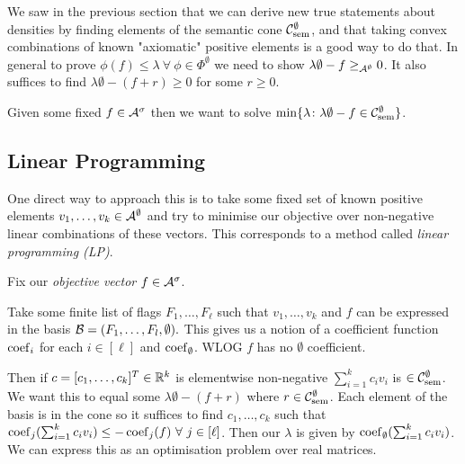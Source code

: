We saw in the previous section that we can derive new true statements about densities
by finding elements of the semantic cone
$\mathcal{C}_\mathrm{sem}^\emptyset$, and that taking convex combinations of known
"axiomatic" positive elements is a good way to do that. In general to prove
$\phi(f) \leq \lambda\ \forall\ \phi\in\Phi^\emptyset$
we need to show $\lambda\emptyset - f \geq_{\mathcal{A}^\emptyset} 0$. It also
suffices to find $\lambda\emptyset - (f + r) \geq 0$ for some $r \geq 0$.

Given some fixed $f\in\mathcal{A}^\sigma$ then we want to solve
$\min\{\lambda\colon \lambda\emptyset - f \in \mathcal{C}_\mathrm{sem}^\emptyset\}$.

\subsection{Linear Programming}

One direct way to approach this is to take some fixed set of known positive elements
$v_1, \dots, v_k\in\mathcal{A}^\emptyset$ and try to minimise our objective over non-negative linear
combinations of these vectors. This corresponds to a method called \textit{linear programming (LP)}.

Fix our \textit{objective vector} $f\in\mathcal{A}^\sigma$.

Take some finite list of flags $F_1, \dots, F_\ell$ such that $v_1, \dots, v_k$ and $f$
can be expressed in the basis $\mathcal{B} = (F_1, \dots, F_l, \emptyset).$
This gives us a notion of a coefficient function $\operatorname{coef}_i$ for each $i\in[\ell]$ and
$\operatorname{coef}_\emptyset$. WLOG $f$ has no $\emptyset$ coefficient.

Then if $c=[c_1, \dots, c_k]^T\in\mathbb{R}^k$ is elementwise non-negative
$\sum_{i=1}^kc_iv_i$ is $\in\mathcal{C}_\mathrm{sem}^\emptyset$. We want this to equal some
$\lambda\emptyset - (f+r)$ where $r\in\mathcal{C}_\mathrm{sem}^\emptyset$.
Each element of the basis is in the cone so it suffices
to find $c_1, \dots, c_k$ such that $\operatorname{coef}_j(\sum_{i=1}^kc_i v_i) \leq -\operatorname{coef}_j(f)\ \forall\ j\in[\ell]$.
Then our $\lambda$ is given by $\operatorname{coef}_\emptyset(\sum_{i=1}^kc_iv_i)$. We can express
this as an optimisation problem over real matrices.

